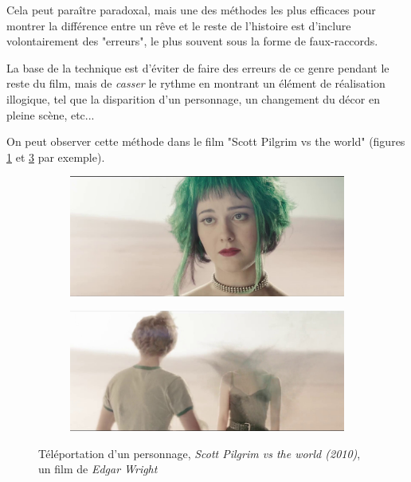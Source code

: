 \documentclass[../main.tex]{subfile}
\begin{document}
Cela peut paraître paradoxal, mais une des méthodes les plus efficaces pour
montrer la différence entre un rêve et le reste de l'histoire est d'inclure
volontairement des "erreurs", le plus souvent sous la forme de faux-raccords.

La base de la technique est d'éviter de faire des erreurs de ce genre pendant
le reste du film, mais de \emph{casser} le rythme en montrant un élément de
réalisation illogique, tel que la disparition d'un personnage, un changement du
décor en pleine scène, etc...

On peut observer cette méthode dans le film "Scott Pilgrim vs the world"
(figures \ref{fig:images_scott1} et \ref{fig:images_scott2} par exemple).

\begin{figure}
    \centering
    \begin{subfigure}[b]{0.4\textwidth}
        \includegraphics[width=\textwidth]{images/scott1}
        \label{fig:images_scott1}
    \end{subfigure}
    \begin{subfigure}[b]{0.4\textwidth}
        \includegraphics[width=\textwidth]{images/scott2}
        \label{fig:images_scott2}
    \end{subfigure}
    \caption{Téléportation d'un personnage, \textit{Scott Pilgrim vs the world
             (2010)}, un film de \textit{Edgar Wright}}
\end{figure}
\end{document}
